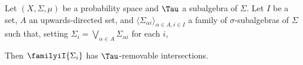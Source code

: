  Let $(X,\Sigma,\mu)$ be a probability space and $\Tau$ a
subalgebra of $\Sigma$.   Let $I$ be a set, $A$ an upwards-directed set,
and $\langle\Sigma_{\alpha i}\rangle_{\alpha\in A,i\in I}$ a family
of $\sigma$-subalgebras of $\Sigma$ such that, setting
$\Sigma_i=\bigvee_{\alpha\in A}\Sigma_{\alpha i}$ for each $i$,


\noindent Then $\familyiI{\Sigma_i}$ has $\Tau$-removable intersections.

